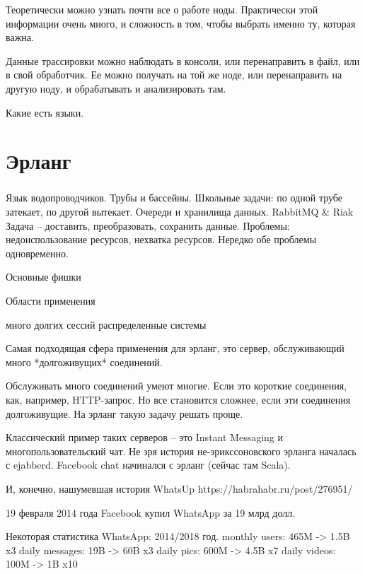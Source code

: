 \documentclass[10pt]{beamer}
\begin{document}
Теоретически можно узнать почти все о работе ноды. Практически этой
информации очень много, и сложность в том, чтобы выбрать именно ту, которая важна.

Данные трассировки можно наблюдать в консоли, или перенаправить в
файл, или в свой обработчик. Ее можно получать на той же ноде, или
перенаправить на другую ноду, и обрабатывать и анализировать там.


Какие есть языки.


\section{Эрланг}

\begin{frame}
\frametitle{}
\centering
\par \bigskip
\end{frame}

\begin{frame}
\frametitle{}
\centering
\par \bigskip
\end{frame}

Язык водопроводчиков. Трубы и бассейны. Школьные задачи: по одной трубе затекает, по другой вытекает.
Очереди и хранилища данных.
RabbitMQ & Riak
Задача -- доставить, преобразовать, сохранить данные.
Проблемы: недоиспользование ресурсов, нехватка ресурсов. Нередко обе проблемы одновременно.

Основные фишки

Области применения

много долгих сессий
распределенные системы

Самая подходящая сфера применения для эрланг, это сервер, обслуживающий много *долгоживущих* соединений.

Обслуживать много соединений умеют многие. Если это короткие соединения, как, например, HTTP-запрос.
Но все становится сложнее, если эти соединения долгоживущие. На эрланг такую задачу решать проще.

Классический пример таких серверов -- это Instant Messaging и многопользовательский чат.
Не зря история не-эрикссоновского эрланга началась с ejabberd.
Facebook chat начинался с эрланг (сейчас там Scala).

И, конечно, нашумевшая история WhatsUp https://habrahabr.ru/post/276951/

19 февраля 2014 года Facebook купил WhatsApp за 19 млрд долл.

Некоторая статистика WhatsApp:
2014/2018 год.
monthly users:  465M -> 1.5B  x3
daily messages:  19B ->  60B  x3
daily pics:     600M -> 4.5B  x7
daily videos:   100M ->   1B  x10
\end{document}

